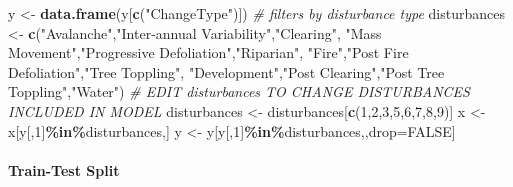 \documentclass[
]{article}
\newenvironment{Shaded}{\begin{snugshade}}{\end{snugshade}}
\newcommand{\CommentTok}[1]{\textcolor[rgb]{0.56,0.35,0.01}{\textit{#1}}}
\newcommand{\ConstantTok}[1]{\textcolor[rgb]{0.56,0.35,0.01}{#1}}
\newcommand{\DecValTok}[1]{\textcolor[rgb]{0.00,0.00,0.81}{#1}}
\newcommand{\FunctionTok}[1]{\textcolor[rgb]{0.13,0.29,0.53}{\textbf{#1}}}
\newcommand{\NormalTok}[1]{#1}
\newcommand{\OtherTok}[1]{\textcolor[rgb]{0.56,0.35,0.01}{#1}}
\newcommand{\SpecialCharTok}[1]{\textcolor[rgb]{0.81,0.36,0.00}{\textbf{#1}}}
\newcommand{\StringTok}[1]{\textcolor[rgb]{0.31,0.60,0.02}{#1}}
\begin{document}
\begin{Shaded}
\begin{Highlighting}[]
\NormalTok{y }\OtherTok{\textless{}{-}} \FunctionTok{data.frame}\NormalTok{(y[}\FunctionTok{c}\NormalTok{(}\StringTok{"ChangeType"}\NormalTok{)])}
\CommentTok{\# filters by disturbance type }
\NormalTok{disturbances }\OtherTok{\textless{}{-}} \FunctionTok{c}\NormalTok{(}\StringTok{"Avalanche"}\NormalTok{,}\StringTok{"Inter{-}annual Variability"}\NormalTok{,}\StringTok{"Clearing"}\NormalTok{,}
                  \StringTok{"Mass Movement"}\NormalTok{,}\StringTok{"Progressive Defoliation"}\NormalTok{,}\StringTok{"Riparian"}\NormalTok{,}
                  \StringTok{"Fire"}\NormalTok{,}\StringTok{"Post Fire Defoliation"}\NormalTok{,}\StringTok{"Tree Toppling"}\NormalTok{,}
                  \StringTok{"Development"}\NormalTok{,}\StringTok{"Post Clearing"}\NormalTok{,}\StringTok{"Post Tree Toppling"}\NormalTok{,}\StringTok{"Water"}\NormalTok{)}
\CommentTok{\# EDIT \textquotesingle{}disturbances\textquotesingle{} TO CHANGE DISTURBANCES INCLUDED IN MODEL}
\NormalTok{disturbances }\OtherTok{\textless{}{-}}\NormalTok{ disturbances[}\FunctionTok{c}\NormalTok{(}\DecValTok{1}\NormalTok{,}\DecValTok{2}\NormalTok{,}\DecValTok{3}\NormalTok{,}\DecValTok{5}\NormalTok{,}\DecValTok{6}\NormalTok{,}\DecValTok{7}\NormalTok{,}\DecValTok{8}\NormalTok{,}\DecValTok{9}\NormalTok{)]}
\NormalTok{x }\OtherTok{\textless{}{-}}\NormalTok{ x[y[,}\DecValTok{1}\NormalTok{]}\SpecialCharTok{\%in\%}\NormalTok{disturbances,]}
\NormalTok{y }\OtherTok{\textless{}{-}}\NormalTok{ y[y[,}\DecValTok{1}\NormalTok{]}\SpecialCharTok{\%in\%}\NormalTok{disturbances,,drop}\OtherTok{=}\ConstantTok{FALSE}\NormalTok{]}
\end{Highlighting}
\end{Shaded}

\hypertarget{train-test-split}{%
\paragraph{Train-Test Split}\label{train-test-split}}
\end{document}
